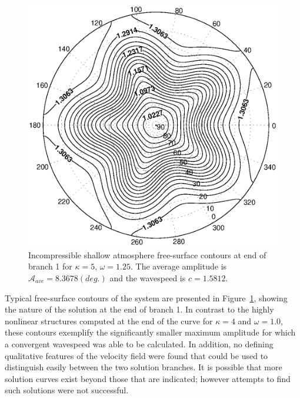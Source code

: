 \begin{figure}[htbp]
	\centering
		\includegraphics[scale=0.75]{IMAGES/k5w125fsb1end.eps}
	\caption{Incompressible shallow atmosphere free-surface contours at end of branch 1 for $\kappa=5$, $\omega=1.25$. The average amplitude is $\mathcal{A}_{ave}=8.3678 (deg.)$ and the wavespeed is $c=1.5812$.}
	\label{fig:k5w125fsb1end}
\end{figure}

Typical free-surface contours of the system are presented in Figure~\ref{fig:k5w125fsb1end}, showing the nature of the solution at the end of branch 1. In contrast to the highly nonlinear structures computed at the end of the curve for $\kappa=4$ and $\omega=1.0$, these contours exemplify the significantly smaller maximum amplitude for which a convergent wavespeed was able to be calculated. In addition, no defining qualitative features of the velocity field were found that could be used to distinguish easily between the two solution branches. It is possible that more solution curves exist beyond those that are indicated; however attempts to find such solutions were not successful. 

